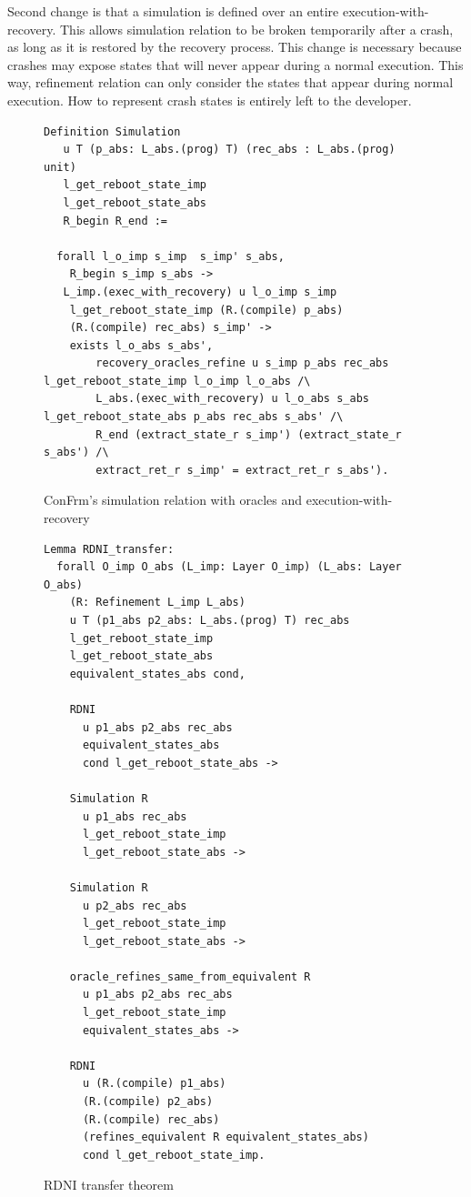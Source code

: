 Second change is that a simulation is defined over an entire execution-with-recovery. This allows simulation relation to be broken temporarily after a crash, as long as it is restored by the recovery process. This change is necessary because crashes may expose states that will never appear during a normal execution. This way, refinement relation can only consider the states that appear during normal execution. How to represent crash states is entirely left to the developer.   

\begin{figure}[H]
\centering
\begin{verbatim}
Definition Simulation
   u T (p_abs: L_abs.(prog) T) (rec_abs : L_abs.(prog) unit)
   l_get_reboot_state_imp
   l_get_reboot_state_abs
   R_begin R_end :=
   
  forall l_o_imp s_imp  s_imp' s_abs,
    R_begin s_imp s_abs ->
   L_imp.(exec_with_recovery) u l_o_imp s_imp
    l_get_reboot_state_imp (R.(compile) p_abs)
    (R.(compile) rec_abs) s_imp' ->
    exists l_o_abs s_abs',
        recovery_oracles_refine u s_imp p_abs rec_abs l_get_reboot_state_imp l_o_imp l_o_abs /\
        L_abs.(exec_with_recovery) u l_o_abs s_abs l_get_reboot_state_abs p_abs rec_abs s_abs' /\
        R_end (extract_state_r s_imp') (extract_state_r s_abs') /\
        extract_ret_r s_imp' = extract_ret_r s_abs').
\end{verbatim}
\caption{ConFrm's simulation relation with oracles and execution-with-recovery}
\label{fig:Simulation_Definition}
\end{figure}


\begin{figure}[H]
\centering
\begin{verbatim}
Lemma RDNI_transfer:
  forall O_imp O_abs (L_imp: Layer O_imp) (L_abs: Layer O_abs) 
    (R: Refinement L_imp L_abs)
    u T (p1_abs p2_abs: L_abs.(prog) T) rec_abs
    l_get_reboot_state_imp
    l_get_reboot_state_abs
    equivalent_states_abs cond,

    RDNI
      u p1_abs p2_abs rec_abs
      equivalent_states_abs
      cond l_get_reboot_state_abs ->
    
    Simulation R 
      u p1_abs rec_abs 
      l_get_reboot_state_imp
      l_get_reboot_state_abs ->

    Simulation R 
      u p2_abs rec_abs 
      l_get_reboot_state_imp
      l_get_reboot_state_abs ->
    
    oracle_refines_same_from_equivalent R 
      u p1_abs p2_abs rec_abs 
      l_get_reboot_state_imp 
      equivalent_states_abs ->
    
    RDNI
      u (R.(compile) p1_abs)
      (R.(compile) p2_abs)
      (R.(compile) rec_abs)
      (refines_equivalent R equivalent_states_abs)
      cond l_get_reboot_state_imp.
\end{verbatim}
\caption{RDNI transfer theorem}
\label{fig:RDNI_Transfer_Definition}
\end{figure}

